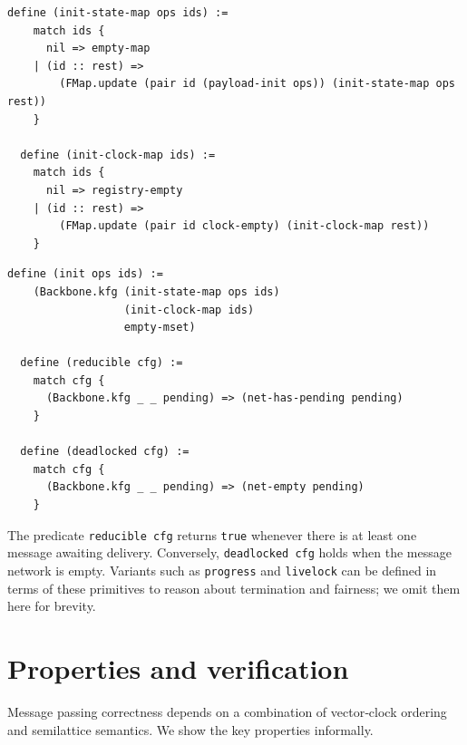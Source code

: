 \begin{lstlisting}[language=Athena,style=athena]
  define (init-state-map ops ids) :=
    match ids {
      nil => empty-map
    | (id :: rest) =>
        (FMap.update (pair id (payload-init ops)) (init-state-map ops rest))
    }

  define (init-clock-map ids) :=
    match ids {
      nil => registry-empty
    | (id :: rest) =>
        (FMap.update (pair id clock-empty) (init-clock-map rest))
    }
\end{lstlisting}

\begin{lstlisting}[language=Athena,style=athena]
  define (init ops ids) :=
    (Backbone.kfg (init-state-map ops ids)
                  (init-clock-map ids)
                  empty-mset)

  define (reducible cfg) :=
    match cfg {
      (Backbone.kfg _ _ pending) => (net-has-pending pending)
    }

  define (deadlocked cfg) :=
    match cfg {
      (Backbone.kfg _ _ pending) => (net-empty pending)
    }
\end{lstlisting}

The predicate \lstinline{reducible cfg} returns \lstinline{true} whenever there is at least one message awaiting delivery.  Conversely, \lstinline{deadlocked cfg} holds when the message network is empty.  Variants such as \lstinline{progress} and \lstinline{livelock} can be defined in terms of these primitives to reason about termination and fairness; we omit them here for brevity.

\section{Properties and verification}

Message passing correctness depends on a combination of vector‑clock ordering and semilattice semantics.  We show the key properties informally.

